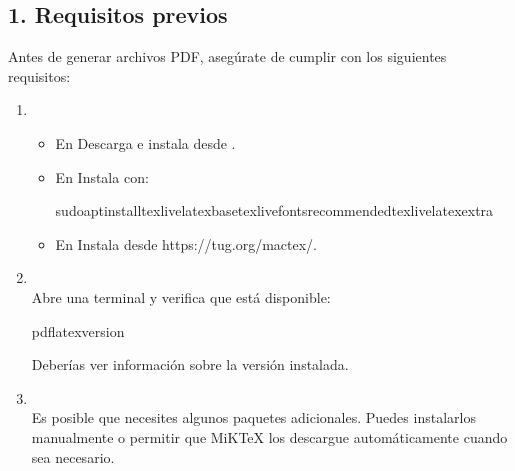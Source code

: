 \documentclass[a4paper,10pt,oneside,spanish,openany]{sphinxmanual}
\begin{document}
\subsection{1. Requisitos previos}
\label{\detokenize{configuracion_inicial/009.Generar_PDF:requisitos-previos}}
\sphinxAtStartPar
Antes de generar archivos PDF, asegúrate de cumplir con los siguientes requisitos:
\begin{enumerate}
%
\item {} 
\sphinxAtStartPar
{}
\begin{itemize}
\item {} 
\sphinxAtStartPar
En  Descarga e instala  desde .

\item {} 
\sphinxAtStartPar
En  Instala  con:

\begin{sphinxVerbatim}[commandchars=\\\{\}]
sudoaptinstalltexlive\PYGZhy{}latex\PYGZhy{}basetexlive\PYGZhy{}fonts\PYGZhy{}recommendedtexlive\PYGZhy{}latex\PYGZhy{}extra
\end{sphinxVerbatim}

\item {} 
\sphinxAtStartPar
En  Instala  desde https://tug.org/mactex/.

\end{itemize}

\item {} 
\sphinxAtStartPar
{}\\
Abre una terminal y verifica que  está disponible:

\begin{sphinxVerbatim}[commandchars=\\\{\}]
pdflatex\PYGZhy{}\PYGZhy{}version
\end{sphinxVerbatim}

\sphinxAtStartPar
Deberías ver información sobre la versión instalada.

\item {} 
\sphinxAtStartPar
{}\\
Es posible que necesites algunos paquetes adicionales. Puedes instalarlos manualmente o permitir que MiKTeX los descargue automáticamente cuando sea necesario.

\end{enumerate}
\end{document}
